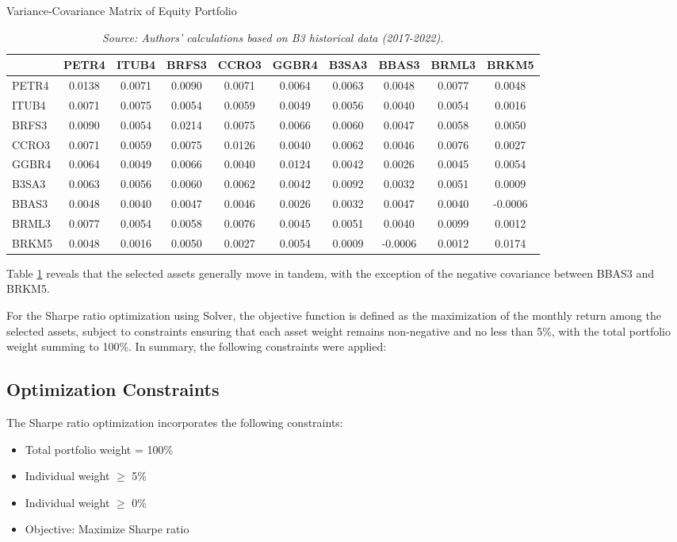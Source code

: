 \documentclass{article}
\begin{document}
\begin{table}[htbp]
\centering
\caption{Variance-Covariance Matrix of Equity Portfolio}
\label{tab:cov_matrix}
\begin{tabular}{lccccccccc}
\toprule
 & PETR4 & ITUB4 & BRFS3 & CCRO3 & GGBR4 & B3SA3 & BBAS3 & BRML3 & BRKM5 \\
\midrule
PETR4 & 0.0138 & 0.0071 & 0.0090 & 0.0071 & 0.0064 & 0.0063 & 0.0048 & 0.0077 & 0.0048 \\
ITUB4 & 0.0071 & 0.0075 & 0.0054 & 0.0059 & 0.0049 & 0.0056 & 0.0040 & 0.0054 & 0.0016 \\
BRFS3 & 0.0090 & 0.0054 & 0.0214 & 0.0075 & 0.0066 & 0.0060 & 0.0047 & 0.0058 & 0.0050 \\
CCRO3 & 0.0071 & 0.0059 & 0.0075 & 0.0126 & 0.0040 & 0.0062 & 0.0046 & 0.0076 & 0.0027 \\
GGBR4 & 0.0064 & 0.0049 & 0.0066 & 0.0040 & 0.0124 & 0.0042 & 0.0026 & 0.0045 & 0.0054 \\
B3SA3 & 0.0063 & 0.0056 & 0.0060 & 0.0062 & 0.0042 & 0.0092 & 0.0032 & 0.0051 & 0.0009 \\
BBAS3 & 0.0048 & 0.0040 & 0.0047 & 0.0046 & 0.0026 & 0.0032 & 0.0047 & 0.0040 & -0.0006 \\
BRML3 & 0.0077 & 0.0054 & 0.0058 & 0.0076 & 0.0045 & 0.0051 & 0.0040 & 0.0099 & 0.0012 \\
BRKM5 & 0.0048 & 0.0016 & 0.0050 & 0.0027 & 0.0054 & 0.0009 & -0.0006 & 0.0012 & 0.0174 \\
\bottomrule
\end{tabular}
\vspace{0.4cm}
\caption*{\textit{Source: Authors' calculations based on B3 historical data (2017-2022).}}
\end{table}

Table \ref{tab:cov_matrix} reveals that the selected assets generally move in tandem, with the exception of the negative covariance between BBAS3 and BRKM5.

For the Sharpe ratio optimization using Solver, the objective function is defined as the maximization of the monthly return among the selected assets, subject to constraints ensuring that each asset weight remains non-negative and no less than 5\%, with the total portfolio weight summing to 100\%. In summary, the following constraints were applied:

\subsection{Optimization Constraints}
The Sharpe ratio optimization incorporates the following constraints:
\begin{itemize}
\item Total portfolio weight = 100\%
\item Individual weight $\geq$ 5\%
\item Individual weight $\geq$ 0\%
\item Objective: Maximize Sharpe ratio
\end{itemize}
\end{document}
